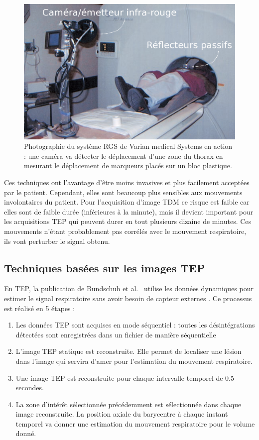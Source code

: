 \begin{figure}[h!]
	\begin{center}
		\includegraphics[width=12cm]{images/varian}
	\end{center}
	\caption{Photographie du système RGS de Varian medical Systems en action : une caméra va détecter le déplacement d'une zone du thorax en mesurant le déplacement de marqueurs placés sur un bloc plastique.} 
	\label{fig:RGSdeVarian}
\end{figure}

Ces techniques ont l'avantage d'être moins invasives et plus facilement acceptées par le patient. Cependant, elles sont beaucoup plus sensibles aux mouvements involontaires du patient. Pour l'acquisition d'image TDM ce risque est faible car elles sont de faible durée (inférieures à la minute), mais il devient important pour les acquisitions TEP qui peuvent durer en tout plusieurs dizaine de minutes. Ces mouvements n'étant probablement pas corrélés avec le mouvement respiratoire, ils vont perturber le signal obtenu. 

\subsection{Techniques basées sur les images TEP}
\label{lab:estimMvtTEP}
En TEP, la publication de Bundschuh et al.~\cite{bundschuh2007postacquisition} utilise les données dynamiques pour estimer le signal respiratoire sans avoir besoin de capteur externes . Ce processus est réalisé en 5 étapes : 

\begin{enumerate}
 \item Les données TEP sont acquises en mode séquentiel : toutes les désintégrations détectées sont enregistrées dans un fichier de manière séquentielle  
 \item L'image TEP statique est reconstruite. Elle permet de localiser une lésion dans l'image qui servira d'amer pour l'estimation du mouvement respiratoire.
 \item Une image TEP est reconstruite pour chaque intervalle temporel de 0.5 secondes.
 \item La zone d'intérêt sélectionnée précédemment est sélectionnée dans chaque image reconstruite. La position axiale du barycentre à chaque instant temporel va donner une estimation du mouvement respiratoire pour le volume donné.
\end{enumerate}

